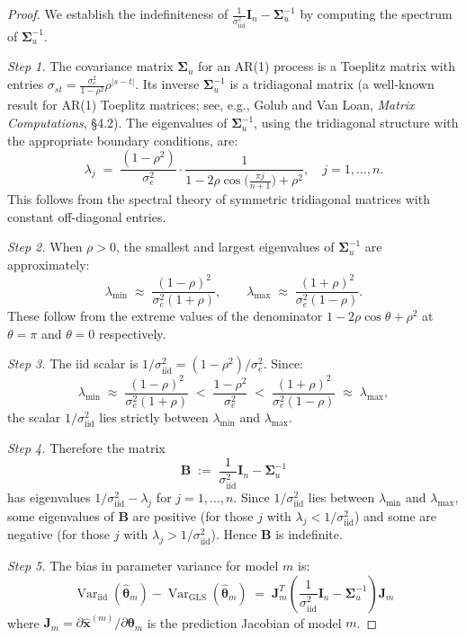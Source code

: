 \documentclass[11pt]{article}
\begin{document}
\begin{proof}
We establish the indefiniteness of $\frac{1}{\sigma_{\mathrm{iid}}^2}\bm{I}_n-\bm{\Sigma}_u^{-1}$ by computing the spectrum of $\bm{\Sigma}_u^{-1}$.

\emph{Step 1.} The covariance matrix $\bm{\Sigma}_u$ for an AR(1) process is a Toeplitz matrix with entries $\sigma_{st}=\frac{\sigma_e^2}{1-\rho^2}\rho^{|s-t|}$. Its inverse $\bm{\Sigma}_u^{-1}$ is a tridiagonal matrix (a well-known result for AR(1) Toeplitz matrices; see, e.g., Golub and Van Loan, \emph{Matrix Computations}, \S4.2). The eigenvalues of $\bm{\Sigma}_u^{-1}$, using the tridiagonal structure with the appropriate boundary conditions, are:
\begin{equation}\label{eq:eigenvalues-sigma-inv}
\lambda_j\;=\;\frac{(1-\rho^2)}{\sigma_e^2}\cdot\frac{1}{1-2\rho\cos\!\bigl(\frac{\pi j}{n+1}\bigr)+\rho^2},\quad j=1,\ldots,n.
\end{equation}
This follows from the spectral theory of symmetric tridiagonal matrices with constant off-diagonal entries.

\emph{Step 2.} When $\rho>0$, the smallest and largest eigenvalues of $\bm{\Sigma}_u^{-1}$ are approximately:
\[
\lambda_{\min}\;\approx\;\frac{(1-\rho)^2}{\sigma_e^2(1+\rho)},\qquad
\lambda_{\max}\;\approx\;\frac{(1+\rho)^2}{\sigma_e^2(1-\rho)}.
\]
These follow from the extreme values of the denominator $1-2\rho\cos\theta+\rho^2$ at $\theta=\pi$ and $\theta=0$ respectively.

\emph{Step 3.} The iid scalar is $1/\sigma_{\mathrm{iid}}^2=(1-\rho^2)/\sigma_e^2$. Since:
\[
\lambda_{\min}\;\approx\;\frac{(1-\rho)^2}{\sigma_e^2(1+\rho)}\;<\;\frac{1-\rho^2}{\sigma_e^2}\;<\;\frac{(1+\rho)^2}{\sigma_e^2(1-\rho)}\;\approx\;\lambda_{\max},
\]
the scalar $1/\sigma_{\mathrm{iid}}^2$ lies strictly between $\lambda_{\min}$ and $\lambda_{\max}$.

\emph{Step 4.} Therefore the matrix
\[
\bm{B}\;:=\;\frac{1}{\sigma_{\mathrm{iid}}^2}\bm{I}_n-\bm{\Sigma}_u^{-1}
\]
has eigenvalues $1/\sigma_{\mathrm{iid}}^2-\lambda_j$ for $j=1,\ldots,n$. Since $1/\sigma_{\mathrm{iid}}^2$ lies between $\lambda_{\min}$ and $\lambda_{\max}$, some eigenvalues of $\bm{B}$ are positive (for those $j$ with $\lambda_j<1/\sigma_{\mathrm{iid}}^2$) and some are negative (for those $j$ with $\lambda_j>1/\sigma_{\mathrm{iid}}^2$). Hence $\bm{B}$ is indefinite.

\emph{Step 5.} The bias in parameter variance for model $m$ is:
\begin{equation}\label{eq:variance-bias}
\operatorname{Var}_{\mathrm{iid}}(\hat{\boldsymbol{\theta}}_m)-\operatorname{Var}_{\mathrm{GLS}}(\hat{\boldsymbol{\theta}}_m)\;=\;\bm{J}_m^T\!\left(\frac{1}{\sigma_{\mathrm{iid}}^2}\bm{I}_n-\bm{\Sigma}_u^{-1}\right)\bm{J}_m
\end{equation}
where $\bm{J}_m=\partial\bm{\hat{x}}^{(m)}/\partial\boldsymbol{\theta}_m$ is the prediction Jacobian of model $m$.


\end{proof}
\end{document}
